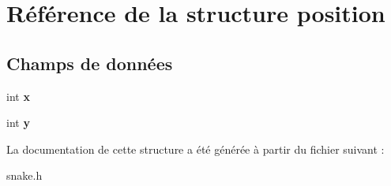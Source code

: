 \hypertarget{structposition}{\section{Référence de la structure position}
\label{structposition}
}
\subsection*{Champs de données}
\begin{DoxyCompactItemize}
\item 
\hypertarget{structposition_a6150e0515f7202e2fb518f7206ed97dc}{int {\bfseries x}}\label{structposition_a6150e0515f7202e2fb518f7206ed97dc}

\item 
\hypertarget{structposition_a0a2f84ed7838f07779ae24c5a9086d33}{int {\bfseries y}}\label{structposition_a0a2f84ed7838f07779ae24c5a9086d33}

\end{DoxyCompactItemize}


La documentation de cette structure a été générée à partir du fichier suivant \-:\begin{DoxyCompactItemize}
\item 
snake.\-h\end{DoxyCompactItemize}
